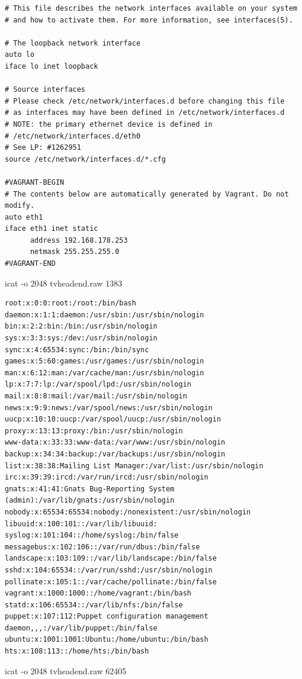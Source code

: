 \begin{cmd}[H]
\begin{verbatim}
# This file describes the network interfaces available on your system
# and how to activate them. For more information, see interfaces(5).

# The loopback network interface
auto lo
iface lo inet loopback

# Source interfaces
# Please check /etc/network/interfaces.d before changing this file
# as interfaces may have been defined in /etc/network/interfaces.d
# NOTE: the primary ethernet device is defined in
# /etc/network/interfaces.d/eth0
# See LP: #1262951
source /etc/network/interfaces.d/*.cfg

#VAGRANT-BEGIN
# The contents below are automatically generated by Vagrant. Do not modify.
auto eth1
iface eth1 inet static
      address 192.168.178.253
      netmask 255.255.255.0
#VAGRANT-END
\end{verbatim}
\caption{icat -o 2048 tvheadend.raw 1383}
\label{cmd:tvheadend-interfaces}
\end{cmd}

\begin{cmd}[H]
\begin{verbatim}
root:x:0:0:root:/root:/bin/bash
daemon:x:1:1:daemon:/usr/sbin:/usr/sbin/nologin
bin:x:2:2:bin:/bin:/usr/sbin/nologin
sys:x:3:3:sys:/dev:/usr/sbin/nologin
sync:x:4:65534:sync:/bin:/bin/sync
games:x:5:60:games:/usr/games:/usr/sbin/nologin
man:x:6:12:man:/var/cache/man:/usr/sbin/nologin
lp:x:7:7:lp:/var/spool/lpd:/usr/sbin/nologin
mail:x:8:8:mail:/var/mail:/usr/sbin/nologin
news:x:9:9:news:/var/spool/news:/usr/sbin/nologin
uucp:x:10:10:uucp:/var/spool/uucp:/usr/sbin/nologin
proxy:x:13:13:proxy:/bin:/usr/sbin/nologin
www-data:x:33:33:www-data:/var/www:/usr/sbin/nologin
backup:x:34:34:backup:/var/backups:/usr/sbin/nologin
list:x:38:38:Mailing List Manager:/var/list:/usr/sbin/nologin
irc:x:39:39:ircd:/var/run/ircd:/usr/sbin/nologin
gnats:x:41:41:Gnats Bug-Reporting System (admin):/var/lib/gnats:/usr/sbin/nologin
nobody:x:65534:65534:nobody:/nonexistent:/usr/sbin/nologin
libuuid:x:100:101::/var/lib/libuuid:
syslog:x:101:104::/home/syslog:/bin/false
messagebus:x:102:106::/var/run/dbus:/bin/false
landscape:x:103:109::/var/lib/landscape:/bin/false
sshd:x:104:65534::/var/run/sshd:/usr/sbin/nologin
pollinate:x:105:1::/var/cache/pollinate:/bin/false
vagrant:x:1000:1000::/home/vagrant:/bin/bash
statd:x:106:65534::/var/lib/nfs:/bin/false
puppet:x:107:112:Puppet configuration management daemon,,,:/var/lib/puppet:/bin/false
ubuntu:x:1001:1001:Ubuntu:/home/ubuntu:/bin/bash
hts:x:108:113::/home/hts:/bin/bash
\end{verbatim}
\caption{icat -o 2048 tvheadend.raw 62405}
\label{cmd:tvheadend-passwd}
\end{cmd}

